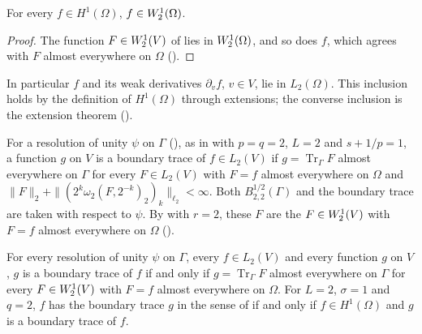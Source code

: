 \begin{theorem}
\label{thm:sobolev-lipschitz-domain-weak}
\leanok
{}
For every $f \in H^1(\Omega)$, $f \in W^{1}_{2}(\Omega)$.
\end{theorem}

\begin{proof}
\leanok
The function $F \in W^{1}_{2}(V)$ of  lies in
$W^{1}_{2}(\Omega)$, and so does $f$, which agrees with $F$ almost everywhere on $\Omega$
().
\end{proof}

In particular $f$ and its weak derivatives $\partial_v f$, $v \in V$, lie in $L_2(\Omega)$. This
inclusion holds by the definition of $H^1(\Omega)$ through extensions; the converse inclusion is
the extension theorem ().

For a resolution of unity $\psi$ on $\Gamma$ (), as in
 with $p = q = 2$, $L = 2$ and $s + 1/p = 1$, a function $g$ on
$V$ is a boundary trace of $f \in L_2(V)$ if $g = \operatorname{Tr}_\Gamma F$ almost everywhere
on $\Gamma$ for every $F \in L_2(V)$ with $F = f$ almost everywhere on $\Omega$ and
$\|F\|_2 + \|(2^k \omega_2(F, 2^{-k})_2)_k\|_{\ell_2} < \infty$. Both $B^{1/2}_{2,2}(\Gamma)$ and
the boundary trace are taken with respect to $\psi$. By  with
$r = 2$, these $F$ are the $F \in W^{1}_{2}(V)$ with $F = f$ almost everywhere on $\Omega$
().

\begin{lemma}
\label{lem:sobolev-lipschitz-domain-trace-extensions}
\leanok
{}
For every resolution of unity $\psi$ on $\Gamma$, every $f \in L_2(V)$ and every function $g$ on
$V$, $g$ is a boundary trace of $f$ if and only if $g = \operatorname{Tr}_\Gamma F$ almost
everywhere on $\Gamma$ for every $F \in W^{1}_{2}(V)$ with $F = f$ almost everywhere on
$\Omega$. For $L = 2$, $\sigma = 1$ and $q = 2$, $f$ has the boundary trace $g$ in the sense of
 if and only if $f \in H^1(\Omega)$ and $g$ is a boundary
trace of $f$.
\end{lemma}

